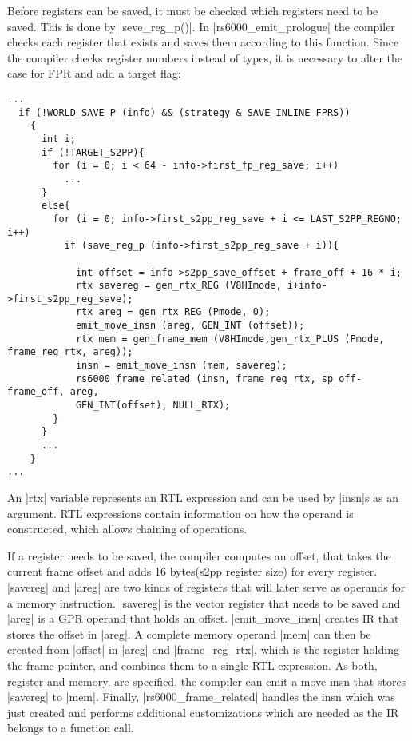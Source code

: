Before registers can be saved, it must be checked which registers need to be saved.
This is done by |seve_reg_p()|.
In |rs6000_emit_prologue| the compiler checks each register that exists and saves them according to this function.
Since the compiler checks register numbers instead of types, it is necessary to alter the case for \acs{FPR} and add a target flag:
\begin{lstlisting}
...
  if (!WORLD_SAVE_P (info) && (strategy & SAVE_INLINE_FPRS))
    {
      int i;
      if (!TARGET_S2PP){
        for (i = 0; i < 64 - info->first_fp_reg_save; i++)
          ...
      }
      else{
        for (i = 0; info->first_s2pp_reg_save + i <= LAST_S2PP_REGNO; i++)
          if (save_reg_p (info->first_s2pp_reg_save + i)){

            int offset = info->s2pp_save_offset + frame_off + 16 * i;
            rtx savereg = gen_rtx_REG (V8HImode, i+info->first_s2pp_reg_save);
            rtx areg = gen_rtx_REG (Pmode, 0);
            emit_move_insn (areg, GEN_INT (offset));
            rtx mem = gen_frame_mem (V8HImode,gen_rtx_PLUS (Pmode, frame_reg_rtx, areg));
            insn = emit_move_insn (mem, savereg);
            rs6000_frame_related (insn, frame_reg_rtx, sp_off-frame_off, areg,
            GEN_INT(offset), NULL_RTX);
        }
      }
      ...
    }
...
\end{lstlisting}
An |rtx| variable represents an \ac{RTL} expression and can be used by |insn|s as an argument.
\ac{RTL} expressions contain information on how the operand is constructed, which allows chaining of operations.

If a register needs to be saved, the compiler computes an offset, that takes the current frame offset and adds 16 bytes(\ac{s2pp} register size) for every register.
|savereg| and |areg| are two kinds of registers that will later serve as operands for a memory instruction.
|savereg| is the vector register that needs to be saved and |areg| is a \ac{GPR} operand that holds an offset.
|emit_move_insn| creates IR that stores the offset in |areg|.
A complete memory operand |mem| can then be created from |offset| in |areg| and |frame_reg_rtx|, which is the register holding the frame pointer, and combines them to a single \ac{RTL} expression.
As both, register and memory, are specified, the compiler can emit a move insn that stores |savereg| to |mem|.
Finally, |rs6000_frame_related| handles the insn which was just created and performs additional customizations which are needed as the IR belongs to a function call.

